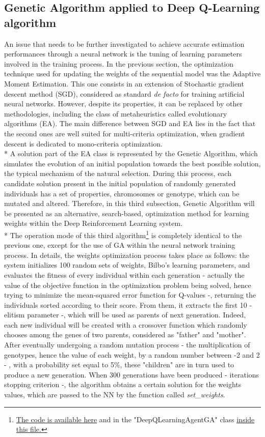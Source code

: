 \subsection{Genetic Algorithm applied to Deep Q-Learning algorithm}
An issue that needs to be further investigated to achieve accurate estimation performances through a neural network is the tuning of learning parameters involved in the training process. In the previous section, the optimization technique used for updating the weights of the sequential model was the Adaptive Moment Estimation. This one consists in an extension of Stochastic gradient descent method (SGD), considered as standard \textit{de facto} for training artificial neural networks. However, despite its properties, it can be replaced by other methodologies, including the class of metaheuristics called evolutionary algorithms (EA). The main difference between SGD and EA lies in the fact that the second ones are well suited for multi-criteria optimization, when gradient descent is dedicated to mono-criteria optimization.\\*
A solution part of the EA class is represented by the Genetic Algorithm, which simulates the evolution of an initial population towards the best possible solution, the typical mechanism of the natural selection. During this process, each candidate solution present in the initial population of randomly generated individuals has a set of properties, chromosomes or genotype, which can be mutated and altered. 
Therefore, in this third subsection, Genetic Algorithm will be presented as an alternative, search-based, optimization method for learning weights within the Deep Reinforcement Learning system.\\*
The operation mode of this third algorithm\footnote{\href{https://github.com/moiraghif/DragonHunting/blob/master/Bilbo\%20World/Bilbo_ga_deep_feels.py}{The code is available here} and in the "DeepQLearningAgentGA" class \href{https://github.com/moiraghif/DragonHunting/blob/master/Bilbo\%20World/agents.py}{inside this file.}} is completely identical to the previous one, except for the use of GA within the neural network training process. In details, the weights optimization process takes place as follows: the system initializes 100 random sets of weights, Bilbo's learning parameters, and evaluates the fitness of every individual within each generation - actually the value of the objective function in the optimization problem being solved, hence trying to minimize the mean-squared error function for Q-values -, returning the individuals sorted according to their score. From them, it extracts the first 10 - elitism parameter -, which will be used as parents of next generation. Indeed, each new individual will be created with a crossover function which randomly chooses among the genes of two parents, considered as "father" and "mother". After eventually undergoing a random mutation process - the multiplication of genotypes, hence the value of each weight, by a random number between -2 and 2 - , with a probability set equal to 5\%, these "children" are in turn used to produce a new generation. When 300 generations have been produced - iterations stopping criterion -, the algorithm obtains a certain solution for the weights values, which are passed to the NN by the function called \textit{set\_weights}. 
